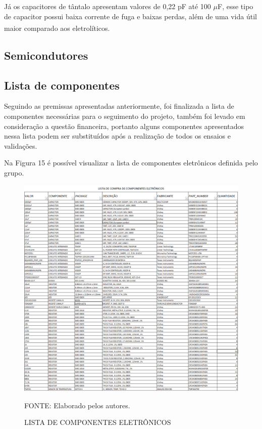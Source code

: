 \documentclass[
	12pt,				%
	openright,			%
	oneside,			%
	a4paper,			%
	english,			%
	french,				%
	spanish,			%
	brazil,				%
	oldfontcommands
	]{abntex2}
\begin{document}
	Já os capacitores de tântalo apresentam valores de 0,22 pF até 100 $\mu$F, esse tipo de capacitor possui baixa corrente de fuga e baixas perdas, além de uma vida útil maior comparado aos eletrolíticos.\textsuperscript{\cite{x7r}}

\subsection[Semicondutores]{Semicondutores}

\subsection[Lista de componentes]{Lista de componentes}

	Seguindo as premissas apresentadas anteriormente, foi finalizada a lista de componentes necessárias para o seguimento do projeto, também foi levado em consideração a questão financeira, portanto alguns componentes apresentados nessa lista podem ser substituídos após a realização de todos os ensaios e validações.
	
	Na Figura 15 é possível visualizar a lista de componentes eletrônicos definida pelo grupo.
	
	\begin{figure}[th]
		\caption{LISTA DE COMPONENTES ELETRÔNICOS}
		\centering
		\includegraphics[width=1.0\linewidth]{./figs/comp}
			
		\begin{small}
			FONTE: Elaborado pelos autores.
		\end{small}		
	\end{figure}
	\pagebreak
	
\end{document}
